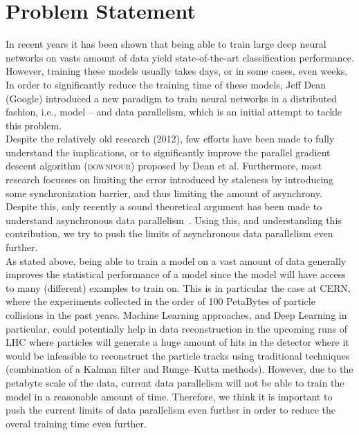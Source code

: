 \section{Problem Statement}
\label{sec:problem_statement}

In recent years it has been shown that being able to train large deep neural networks on vasts amount of data yield state-of-the-art classification performance. However, training these models usually takes days, or in some cases, even weeks. In order to significantly reduce the training time of these models, Jeff Dean (Google) introduced a new paradigm to train neural networks in a distributed fashion, i.e., model – and data parallelism, which is an initial attempt to tackle this problem.\\

Despite the relatively old research (2012), few efforts have been made to fully understand the implications, or to significantly improve the parallel gradient descent algorithm (\textsc{downpour}) proposed by Dean et al. Furthermore, most research focusses on limiting the error introduced by staleness by introducing some synchronization barrier, and thus limiting the amount of asynchrony. Despite this, only recently a sound theoretical argument has been made to understand asynchronous data parallelism~\cite{implicitmomentum}. Using this, and understanding this contribution, we try to push the limits of asynchronous data parallelism even further.\\

As stated above, being able to train a model on a vast amount of data generally improves the statistical performance of a model since the model will have access to many (different) examples to train on. This is in particular the case at CERN, where the experiments collected in the order of 100 PetaBytes of particle collisions in the past years. Machine Learning approaches, and Deep Learning in particular, could potentially help in data reconstruction in the upcoming runs of LHC where particles will generate a huge amount of hits in the detector where it would be infeasible to reconstruct the particle tracks using traditional techniques (combination of a Kalman filter and Runge–Kutta methods). However, due to the petabyte scale of the data, current data parallelism will not be able to train the model in a reasonable amount of time. Therefore, we think it is important to push the current limits of data parallelism even further in order to reduce the overal training time even further.

